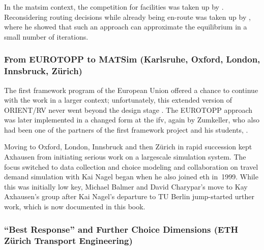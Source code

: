 In the \gls{matsim} context, the competition for facilities was taken up by \citet[][]{HorniEtAl_TRR_2009}.  Reconsidering routing decisions while already being en-route was taken up by \citet[][]{Dobler_PhDThesis_2013}, where he showed that such an approach can approximate the equilibrium in a small number of iterations.

\subsubsection{From EUROTOPP to MATSim (Karlsruhe, Oxford, London, Innsbruck, Zürich)}


The  first framework program of the European Union offered a chance to continue with the work in a larger context; unfortunately, this extended version of ORIENT/RV never went beyond the design stage \citep[][]{AxhausenGoodwin1991}. The EUROTOPP approach was later implemented in a changed form at the \gls{ifv}, again by Zumkeller, who also had been one of the partners of the first framework project \citep[][]{SchnittgerZumkeller_ETC_2004} and his students, .

Moving to Oxford, London, Innsbruck and then Zürich in rapid succession kept Axhausen from initiating serious work on a \gls{largescale} simulation system. 
The focus switched to data collection and choice modeling and 
collaboration on travel demand simulation with Kai Nagel began when he also joined \gls{eth} in~1999. 
While this was initially low key, Michael Balmer and David Charypar's move to Kay Axhausen's group after Kai Nagel's departure to TU Berlin jump-started urther work, which is now documented in %
this book.


\subsubsection{``Best Response'' and Further Choice Dimensions (ETH Zürich Transport Engineering)}
\label{sec:zhgroup_matsim}

